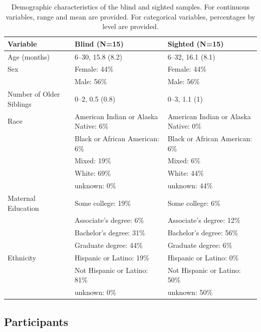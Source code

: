 \documentclass[
  man,floatsintext]{apa6}
\begin{document}
\begin{table}

\caption{\label{tab:participant-characteristics}Demographic characteristics of the blind and sighted samples. For continuous variables, range and mean are provided. For categorical variables, percentages by level are provided.}
\centering
\fontsize{8}{10}\selectfont
\begin{tabular}[t]{l|l|l}
\hline
Variable & Blind (N=15) & Sighted (N=15)\\
\hline
Age (months) & 6--30,
15.8 (8.2) & 6--32,
16.1 (8.1)\\
\hline
Sex & Female: 44\% & Female: 44\%\\
\hline
 & Male: 56\% & Male: 56\%\\
\hline
Number of Older Siblings & 0--2,
0.5 (0.8) & 0--3,
1.1 (1)\\
\hline
Race & American Indian or Alaska Native: 6\% & American Indian or Alaska Native: 0\%\\
\hline
 & Black or African American: 6\% & Black or African American: 6\%\\
\hline
 & Mixed: 19\% & Mixed: 6\%\\
\hline
 & White: 69\% & White: 44\%\\
\hline
 & unknown: 0\% & unknown: 44\%\\
\hline
Maternal Education & Some college: 19\% & Some college: 6\%\\
\hline
 & Associate's degree: 6\% & Associate's degree: 12\%\\
\hline
 & Bachelor's degree: 31\% & Bachelor's degree: 56\%\\
\hline
 & Graduate degree: 44\% & Graduate degree: 6\%\\
\hline
Ethnicity & Hispanic or Latino: 19\% & Hispanic or Latino: 0\%\\
\hline
 & Not Hispanic or Latino: 81\% & Not Hispanic or Latino: 50\%\\
\hline
 & unknown: 0\% & unknown: 50\%\\
\hline
\end{tabular}
\end{table}

\hypertarget{participants}{%
\subsection{Participants}\label{participants}}
\end{document}
